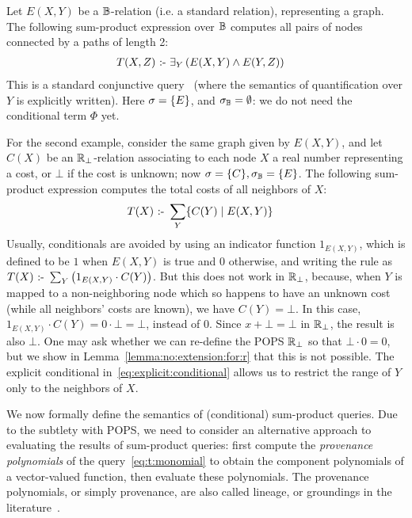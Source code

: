 \begin{ex} \label{ex:conditional:sum:product}
  Let $E(X,Y)$ be a $\mathbb B$-relation (i.e. a standard relation),
  representing a graph.  The following sum-product expression over $\mathbb B$ computes
  all pairs of nodes connected by a paths of length 2:
  \begin{align*}
      T(X,Z) & \text{ :- } \exists_Y \left(E(X,Y) \wedge E(Y,Z)\right)
  \end{align*}
  This is a standard conjunctive
  query~\cite{DBLP:books/aw/AbiteboulHV95} (where the semantics of
  quantification over $Y$ is explicitly written).  Here
  $\sigma = \{E\}$, and $\sigma_\mathbb B = \emptyset$: we do not need the
  conditional term $\Phi$ yet.

  For the second example, consider the same graph given by $E(X,Y)$,
  and let $C(X)$ be an $\mathbb R_\bot$-relation associating to each node $X$
  a real number representing a cost, or $\bot$ if the cost is unknown;
  now $\sigma = \{C\}, \sigma_\mathbb B = \{E\}$.  The following
  sum-product expression computes the total costs of all neighbors of
  $X$:
  \begin{align}
    T(X) \text{ :- } & \sum_Y \{{C(Y)}\mid{E(X,Y)}\} \label{eq:explicit:conditional}
  \end{align}
  Usually, conditionals are avoided by using an indicator function
  $1_{E(X,Y)}$, which is defined to be $1$ when $E(X,Y)$ is true and
  $0$ otherwise, and writing the rule as
  $T(X) \text{ :- } \sum_Y \left(1_{E(X,Y)}\cdot C(Y)\right)$.  But this does
  not work in $\mathbb R_\bot$, because, when $Y$ is mapped to a
  non-neighboring node which so happens to have an unknown cost (while
  all neighbors' costs are known), we have $C(Y) = \bot$. In this
  case, $1_{E(X,Y)} \cdot C(Y) = 0 \cdot \bot = \bot$, instead of
  $0$. Since $x + \bot = \bot$ in $\mathbb R_\bot$, the result is also
  $\bot$.  One may ask whether we can re-define the POPS $\mathbb R_\bot$ so
  that $\bot \cdot 0 = 0$, but we show in
  Lemma~\ref{lemma:no:extension:for:r} that this is not possible.  The
  explicit conditional in~\eqref{eq:explicit:conditional} allows us to
  restrict the range of $Y$ only to the neighbors of $X$.
\end{ex}

We now formally define the semantics of (conditional) sum-product queries.
Due to the subtlety with POPS, we need to consider an alternative approach to evaluating
the results of sum-product queries: first compute the {\em provenance polynomials} of
the query~\eqref{eq:t:monomial} to obtain the component polynomials of a vector-valued
function, then evaluate these polynomials.  The provenance polynomials, or simply
provenance, are also called lineage, or groundings in the literature~\cite{DBLP:conf/pods/GreenKT07}.

